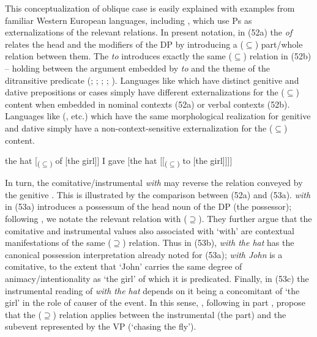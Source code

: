 \documentclass[output=paper]{langsci/langscibook}
\begin{document}
This conceptualization of oblique case is easily explained with examples from familiar Western European languages, including , which use Ps as externalizations of the relevant relations. In present notation, in (52a) the   \textit{of} relates the head and the modifiers of the DP by introducing a ($\subseteq$) part\slash whole relation between them. The   \textit{to} introduces exactly the same ($\subseteq$) relation in (52b) – holding between the argument embedded by \textit{to} and the theme of the ditransitive predicate (\citealt{Kayne1984}; \citealt{Pesetsky1995}; \citealt{Harley2002Possession}; \citealt{Beck2004}; \citealt{Manzini2016}).  Languages like  which have distinct genitive and dative prepositions or cases simply have different externalizations for the ($\subseteq$) content when embedded in nominal contexts (52a) or verbal contexts (52b). Languages like  (, etc.) which have the same morphological realization for genitive and dative simply have a non-context-sensitive externalization for the ($\subseteq$) content.

\ea%
    \label{ex:manzini:52}
    \ea  the hat [\textsubscript{($\subseteq$)} of [the girl]]
    \ex  I gave [the hat [[\textsubscript{($\subseteq$)} to [the girl]]]]
    \z    
\z

In turn, the comitative\slash instrumental  \textit{with} may reverse the relation conveyed by the genitive \citep{Levinson2011}. This is illustrated by the comparison between  (52a) and (53a).  \textit{with} in (53a) introduces a possessum of the head noun of the DP (the possessor); following \citet{Franco2017}, we notate the relevant relation with ($\supseteq$). They further argue that the comitative and instrumental values also associated with  ‘with’ are contextual manifestations of the same ($\supseteq$) relation. Thus in (53b), \textit{with the hat} has the canonical possession interpretation already noted for (53a); \textit{with John} is a comitative, to the extent that ‘John’ carries the same degree of animacy\slash intentionality as ‘the girl’ of which it is predicated. Finally, in (53c) the instrumental reading of \textit{with the hat} depends on it being a concomitant of ‘the girl’ in the role of causer of the event. In this sense, \citet{Franco2017}, following in part \citet{Bruening2012}, propose that the ($\supseteq$) relation applies between the instrumental (the part) and the subevent represented by the VP (‘chasing the fly’).
\end{document}
